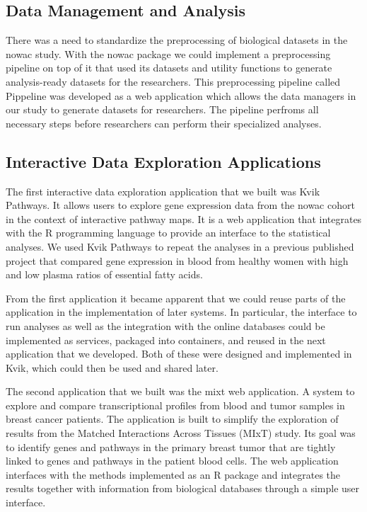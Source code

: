 \subsection{Data Management and Analysis} 
There was a need to standardize the preprocessing of biological datasets in the
\gls{nowac} study. With the \gls{nowac} package we could implement a
preprocessing pipeline on top of it that used its datasets and utility functions
to generate analysis-ready datasets for the researchers.  This preprocessing
pipeline called Pippeline was developed as a web application which allows the
data managers in our study to generate datasets for researchers.\cite{pippeline}
The pipeline perfroms all necessary steps before researchers can perform their
specialized analyses. 

\subsection{Interactive Data Exploration Applications}
The first interactive data exploration application that we built was Kvik
Pathways.  It allows users to explore gene expression data from the \gls{nowac}
cohort in the context of interactive pathway maps.\cite{fjukstad2015kvik} It is
a web application that integrates with the R programming language to provide an
interface to the statistical analyses. We used Kvik Pathways to repeat the
analyses in a previous published project that compared gene expression in blood
from healthy women with high and low plasma ratios of essential fatty
acids.\cite{olsen2013plasma}

From the first application it became apparent that we could reuse parts of the
application in the implementation of later systems. In particular, the interface
to run analyses as well as the integration with the online databases could be
implemented as services, packaged into containers, and reused in the next
application that we developed. Both of these were designed and implemented in
Kvik, which could then be used and shared later. 

The second application that we built was the \gls{mixt} web application. A
system to explore and compare transcriptional profiles from blood and tumor
samples in breast cancer patients. The application is built to simplify the
exploration of results from the Matched Interactions Across Tissues (MIxT)
study. Its goal was to identify genes and pathways in the primary breast tumor
that are tightly linked to genes and pathways in the patient blood
cells.\cite{dumeaux2017interactions} The web application interfaces with the
methods implemented as an R package and integrates the results together with
information from biological databases through a simple user interface. 

